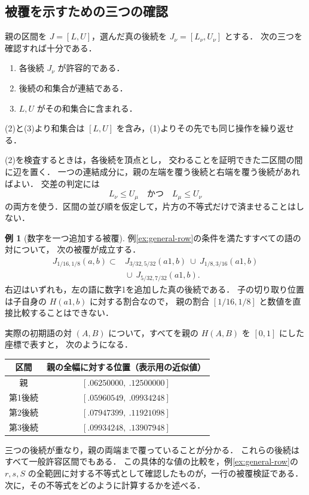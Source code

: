 \documentclass[11pt,a4paper]{article}
\theoremstyle{definition}
\newtheorem{example}{例}
\begin{document}
\subsection{被覆を示すための三つの確認}
親の区間を $J=[L,U]$，選んだ真の後続を $J_\nu=[L_\nu,U_\nu]$ とする．
次の三つを確認すれば十分である．
\begin{enumerate}
\item 各後続 $J_\nu$ が許容的である．
\item 後続の和集合が連結である．
\item $L,U$ がその和集合に含まれる．
\end{enumerate}
(2)と(3)より和集合は $[L,U]$ を含み，(1)よりその先でも同じ操作を繰り返せる．

(2)を検査するときは，各後続を頂点とし，
交わることを証明できた二区間の間に辺を置く．
一つの連結成分に，親の左端を覆う後続と右端を覆う後続があればよい．
交差の判定には
\begin{equation}\label{eq:intersection}
 L_\nu\le U_\mu\quad\text{かつ}\quad L_\mu\le U_\nu
\end{equation}
の両方を使う．区間の並び順を仮定して，片方の不等式だけで済ませることはしない．

\begin{example}[数字を一つ追加する被覆]\label{ex:three-children}
例\ref{ex:general-row}の条件を満たすすべての語の対について，
次の被覆が成立する．
\[
\begin{split}
 J_{1/16,1/8}(a,b)\subset{}&
 J_{3/32,5/32}(a1,b)\ \cup\ J_{1/8,3/16}(a1,b)\\
 &{}\cup\ J_{5/32,7/32}(a1,b).
\end{split}
\]
右辺はいずれも，左の語に数字1を追加した真の後続である．
子の切り取り位置は子自身の $H(a1,b)$ に対する割合なので，
親の割合 $[1/16,1/8]$ と数値を直接比較することはできない．

実際の初期語の対 $(A,B)$ について，すべてを親の $H(A,B)$ を $[0,1]$ にした座標で表すと，
次のようになる．
\begin{center}\small
\begin{tabular}{cc}
\toprule
区間 & 親の全幅に対する位置（表示用の近似値）\\
\midrule
親 & $[.06250000,\ .12500000]$\\
第1後続 & $[.05960549,\ .09934248]$\\
第2後続 & $[.07947399,\ .11921098]$\\
第3後続 & $[.09934248,\ .13907948]$\\
\bottomrule
\end{tabular}
\end{center}
三つの後続が重なり，親の両端まで覆っていることが分かる．
これらの後続はすべて一般許容区間でもある．
この具体的な値の比較を，例\ref{ex:general-row}の
$r,s,S$ の全範囲に対する不等式として確認したものが，一行の被覆検証である．
次に，その不等式をどのように計算するかを述べる．
\end{example}
\end{document}
